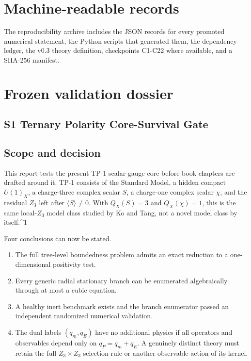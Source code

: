 \documentclass[
]{article}
\providecommand{\tightlist}{%
  \setlength{\itemsep}{0pt}\setlength{\parskip}{0pt}}
\begin{document}
\hypertarget{machine-readable-records}{%
\section{Machine-readable records}\label{machine-readable-records}}

The reproducibility archive includes the JSON records for every promoted
numerical statement, the Python scripts that generated them, the
dependency ledger, the v0.3 theory definition, checkpoints C1-C22 where
available, and a SHA-256 manifest.

\newpage

\hypertarget{frozen-validation-dossier}{%
\section{Frozen validation dossier}\label{frozen-validation-dossier}}

\newpage

\hypertarget{s1-ternary-polarity-core-survival-gate}{%
\subsection{S1 Ternary Polarity Core-Survival
Gate}\label{s1-ternary-polarity-core-survival-gate}}

\hypertarget{scope-and-decision}{%
\subsection{Scope and decision}\label{scope-and-decision}}

This report tests the present TP-1 scalar-gauge core before book
chapters are drafted around it. TP-1 consists of the Standard Model, a
hidden compact \(U(1)_X\), a charge-three complex scalar \(S\), a
charge-one complex scalar \(\chi\), and the residual \(Z_3\) left after
\(\langle S\rangle\neq0\). With \(Q_X(S)=3\) and \(Q_X(\chi)=1\), this
is the same local-\(Z_3\) model class studied by Ko and Tang, not a
novel model class by itself.\^{}1

Four conclusions can now be stated.

\begin{enumerate}
\def\labelenumi{\arabic{enumi}.}
\tightlist
\item
  The full tree-level boundedness problem admits an exact reduction to a
  one-dimensional positivity test.
\item
  Every generic radial stationary branch can be enumerated algebraically
  through at most a cubic equation.
\item
  A healthy inert benchmark exists and the branch enumerator passed an
  independent randomized numerical validation.
\item
  The dual labels \((q_m,q_E)\) have no additional physics if all
  operators and observables depend only on \(q_P=q_m+q_E\). A genuinely
  distinct theory must retain the full \(Z_3\times Z_3\) selection rule
  or another observable action of its kernel.
\end{enumerate}
\end{document}
